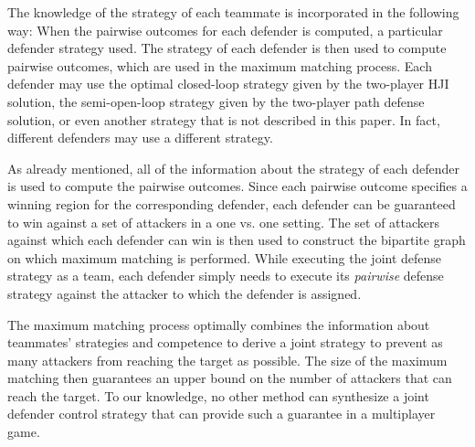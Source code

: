 The knowledge of the strategy of each teammate is incorporated in the following way: When the pairwise outcomes for each defender is computed, a particular defender strategy used. The strategy of each defender is then used to compute pairwise outcomes, which are used in the maximum matching process. Each defender may use the optimal closed-loop strategy given by the two-player HJI solution, the semi-open-loop strategy given by the two-player path defense solution, or even another strategy that is not described in this paper. In fact, different defenders may use a different strategy.

As already mentioned, all of the information about the strategy of each defender is used to compute the pairwise outcomes. Since each pairwise outcome specifies a winning region for the corresponding defender, each defender can be guaranteed to win against a set of attackers in a one vs. one setting. The set of attackers against which each defender can win is then used to construct the bipartite graph on which maximum matching is performed. While executing the joint defense strategy as a team, each defender simply needs to execute its \textit{pairwise} defense strategy against the attacker to which the defender is assigned. 

The maximum matching process optimally combines the information about teammates' strategies and competence to derive a joint strategy to prevent as many attackers from reaching the target as possible. The size of the maximum matching then guarantees an upper bound on the number of attackers that can reach the target. To our knowledge, no other method can synthesize a joint defender control strategy that can provide such a guarantee in a multiplayer game. 